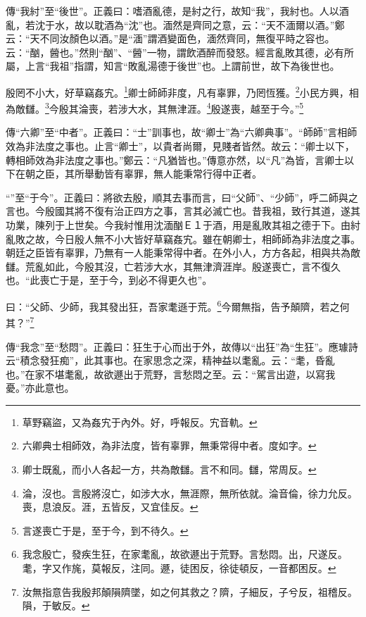 {\noindent\zhuan{}\fzbyks 傳“我紂”至“後世”。正義曰：嗜酒亂德，是紂之行，故知“我”，我紂也。人以酒亂，若沈于水，故以耽酒為“沈”也。湎然是齊同之意，云：“天不湎爾以酒。”鄭云：“天不同汝顏色以酒。”是“湎”謂酒變面色，湎然齊同，無復平時之容也。云：“酗，醟也。”然則“酗”、“醟”一物，謂飲酒醉而發怒。經言亂敗其德，必有所屬，上言“我祖”指謂，知言“敗亂湯德于後世”也。上謂前世，故下為後世也。 \par}

殷罔不小大，好草竊姦宄。\footnote{草野竊盜，又為姦宄于內外。好，呼報反。宄音軌。}卿士師師非度，凡有辜罪，乃罔恆獲。\footnote{六卿典士相師效，為非法度，皆有辜罪，無秉常得中者。度如字。}小民方興，相為敵讎。\footnote{卿士既亂，而小人各起一方，共為敵讎。言不和同。讎，常周反。}今殷其淪喪，若涉大水，其無津涯。\footnote{淪，沒也。言殷將沒亡，如涉大水，無涯際，無所依就。淪音倫，徐力允反。喪，息浪反。涯，五皆反，又宜佳反。}殷遂喪，越至于今。”\footnote{言遂喪亡于是，至于今，到不待久。}

{\noindent\zhuan{}\fzbyks 傳“六卿”至“中者”。正義曰：“士”訓事也，故“卿士”為“六卿典事”。“師師”言相師效為非法度之事也。止言“卿士”，以貴者尚爾，見賤者皆然。故云：“卿士以下，轉相師效為非法度之事也。”鄭云：“凡猶皆也。”傳意亦然，以“凡”為皆，言卿士以下在朝之臣，其所舉動皆有辜罪，無人能秉常行得中正者。 \par}

{\noindent\shu{}\fzkt “”至“于今”。正義曰：將欲去殷，順其去事而言，曰“父師”、“少師”，呼二師與之言也。今殷國其將不復有治正四方之事，言其必滅亡也。昔我祖，致行其道，遂其功業，陳列于上世矣。今我紂惟用沈湎酗Ｅ１于酒，用是亂敗其祖之德于下。由紂亂敗之故，今日殷人無不小大皆好草竊姦宄。雖在朝卿士，相師師為非法度之事。朝廷之臣皆有辜罪，乃無有一人能秉常得中者。在外小人，方方各起，相與共為敵讎。荒亂如此，今殷其沒，亡若涉大水，其無津濟涯岸。殷遂喪亡，言不復久也。“此喪亡于是，至于今，到必不得更久也”。 \par}

曰：“父師、少師，我其發出狂，吾家耄遜于荒。\footnote{我念殷亡，發疾生狂，在家耄亂，故欲遯出于荒野。言愁悶。出，尺遂反。耄，字又作旄，莫報反，注同。遯，徒困反，徐徒頓反，一音都困反。}今爾無指，告予顛隮，若之何其？”\footnote{汝無指意告我殷邦顛隕隮墜，如之何其救之？隮，子細反，子兮反，祖稽反。隕，于敏反。}


{\noindent\zhuan{}\fzbyks 傳“我念”至“愁悶”。正義曰：狂生于心而出于外，故傳以“出狂”為“生狂”。應璩詩云“積念發狂痴”，此其事也。在家思念之深，精神益以耄亂。云：“耄，昏亂也。”在家不堪耄亂，故欲遯出于荒野，言愁悶之至。云：“駕言出遊，以寫我憂。”亦此意也。 \par}

